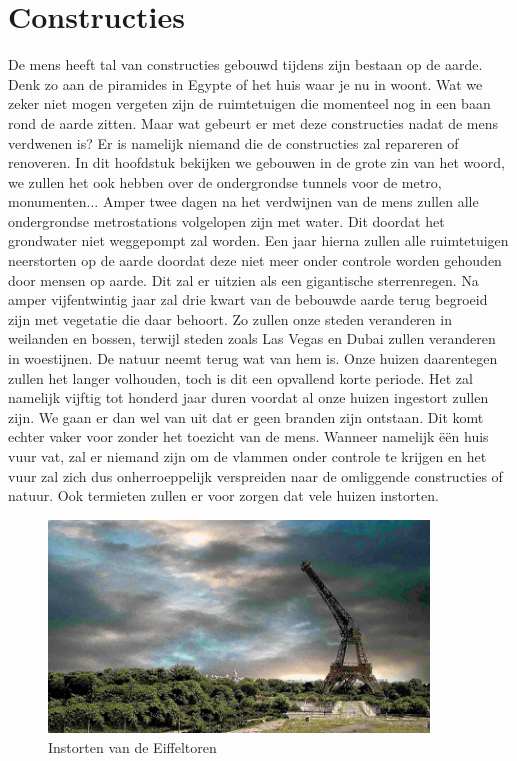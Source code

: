 \newpage
\section{Constructies}
De mens heeft tal van constructies gebouwd tijdens zijn bestaan op de aarde. Denk zo aan de piramides in Egypte of het huis waar je nu in woont. Wat we zeker niet mogen vergeten zijn de ruimtetuigen die momenteel nog in een baan rond de aarde zitten. Maar wat gebeurt er met deze constructies nadat de mens verdwenen is? Er is namelijk niemand die de constructies zal repareren of renoveren. In dit hoofdstuk bekijken we gebouwen in de grote zin van het woord, we zullen het ook hebben over de ondergrondse tunnels voor de metro, monumenten...
\newline
\newline
Amper twee dagen na het verdwijnen van de mens zullen alle ondergrondse metrostations volgelopen zijn met water. Dit doordat het grondwater niet weggepompt zal worden. Een jaar hierna zullen alle ruimtetuigen neerstorten op de aarde doordat deze niet meer onder controle worden gehouden door mensen op aarde. Dit zal er uitzien als een gigantische sterrenregen. \cite{LAPOutbreak}
\newline
Na amper vijfentwintig jaar zal drie kwart van de bebouwde aarde terug begroeid zijn met vegetatie die daar behoort. Zo zullen onze steden veranderen in weilanden en bossen, terwijl steden zoals Las Vegas en Dubai zullen veranderen in woestijnen. De natuur neemt terug wat van hem is. \cite{ASAPScience, LAPOutbreak}
\newline
Onze huizen daarentegen zullen het langer volhouden, toch is dit een opvallend korte periode. Het zal namelijk vijftig tot honderd jaar duren voordat al onze huizen ingestort zullen zijn. We gaan er dan wel van uit dat er geen branden zijn ontstaan. Dit komt echter vaker voor zonder het toezicht van de mens. Wanneer namelijk \"{e}\"{e}n huis vuur vat, zal er niemand zijn om de vlammen onder controle te krijgen en het vuur zal zich dus onherroeppelijk verspreiden naar de omliggende constructies of natuur. Ook termieten zullen er voor zorgen dat vele huizen instorten. 
\newline
\begin{figure}
	\centering
	\includegraphics[width=0.9\textwidth]{EiffelToren.png}
	\caption{Instorten van de Eiffeltoren \cite{LAPOutbreak}}
	\label{fig:eiffel}
\end{figure}

